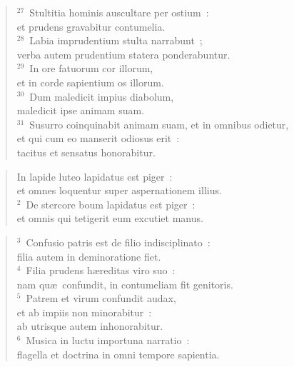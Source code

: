 \begin{flushleft}
\begin{verse}
${}^{27}$~Stultitia hominis auscultare per ostium~:\\ et prudens gravabitur contumelia.\\
${}^{28}$~Labia imprudentium stulta narrabunt~;\\ verba autem prudentium statera ponderabuntur.\\
${}^{29}$~In ore fatuorum cor illorum,\\ et in corde sapientium os illorum.\\
${}^{30}$~Dum maledicit impius diabolum,\\ maledicit ipse animam suam.\\
${}^{31}$~Susurro coinquinabit animam suam, et in omnibus odietur,\\ et qui cum eo manserit odiosus erit~:\\ tacitus et sensatus honorabitur.\end{verse}\end{flushleft}


\begin{flushleft}\begin{verse}\vspace{-19pt}\hspace{6pt}In lapide luteo lapidatus est piger~:\\\hspace{6pt} et omnes loquentur super aspernationem illius.\\
${}^{2}$~De stercore boum lapidatus est piger~:\\ et omnis qui tetigerit eum excutiet manus.\end{verse}\end{flushleft}


\begin{flushleft}\begin{verse}${}^{3}$~Confusio patris est de filio indisciplinato~:\\ filia autem in deminoratione fiet.\\
${}^{4}$~Filia prudens h\ae reditas viro suo~:\\ nam qu\ae\ confundit, in contumeliam fit genitoris.\\
${}^{5}$~Patrem et virum confundit audax,\\ et ab impiis non minorabitur~:\\ ab utrisque autem inhonorabitur.\\
${}^{6}$~Musica in luctu importuna narratio~:\\ flagella et doctrina in omni tempore sapientia.\end{verse}\end{flushleft}


